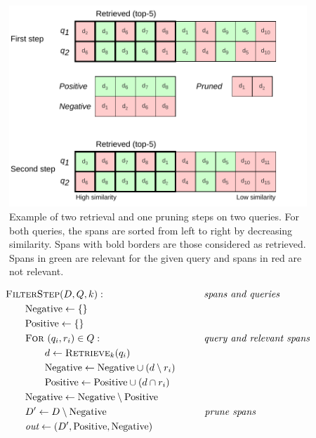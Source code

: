 \begin{figure}[ht]
    \center
    \includegraphics[width=0.95\linewidth]{img/autofilter.pdf}
    
    \caption{Example of two retrieval and one pruning steps on two queries. For both queries, the spans are sorted from left to right by decreasing similarity. Spans with bold borders are those considered as retrieved. Spans in green are relevant for the given query and spans in red are not relevant.}
    \label{fig:autofilter}
\end{figure}

\begin{minipage}{\linewidth}
    \begin{align*}
        & \textsc{FilterStep}(D, Q, k): \qquad\qquad\qquad\qquad\qquad \textit{spans and queries} \qquad\\
        & \qquad \text{Negative} \leftarrow \{\} \\
        & \qquad \text{Positive} \leftarrow \{\} \\
        & \qquad \textsc{For} \,\, (q_i, r_i) \in Q: \qquad\qquad\qquad\qquad\qquad \hspace{0.12cm}\textit{query and relevant spans} \\
        & \qquad \qquad d \leftarrow \textsc{Retrieve}_k(q_i) \\
        & \qquad \qquad \text{Negative} \leftarrow \text{Negative} \cup (d \setminus r_i) \\
        & \qquad \qquad \text{Positive} \leftarrow \text{Positive} \cup (d \cap r_i) \\
        & \qquad \text{Negative} \leftarrow  \text{Negative} \setminus \text{Positive} \\
        & \qquad D' \leftarrow D \setminus \text{Negative}
        \qquad\qquad\qquad\qquad\qquad \textit{prune spans} \\
        & \qquad \textit{out} \leftarrow (D', \text{Positive}, \text{Negative})
    \end{align*}
    \vspace{-0.8cm}
    \captionsetup{type=lstlisting}\caption{Definition of a single filtering step that prunes the spans and provides negative and positive samples}
    \label{lst:autofilter}
\end{minipage}

